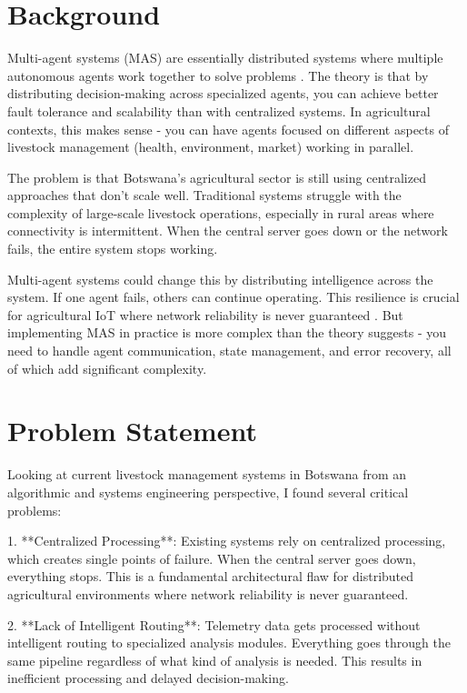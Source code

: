 
\section{Background}

Multi-agent systems (MAS) are essentially distributed systems where multiple autonomous agents work together to solve problems \cite{wooldridge2009introduction}. The theory is that by distributing decision-making across specialized agents, you can achieve better fault tolerance and scalability than with centralized systems. In agricultural contexts, this makes sense - you can have agents focused on different aspects of livestock management (health, environment, market) working in parallel.

The problem is that Botswana's agricultural sector is still using centralized approaches that don't scale well. Traditional systems struggle with the complexity of large-scale livestock operations, especially in rural areas where connectivity is intermittent. When the central server goes down or the network fails, the entire system stops working.

Multi-agent systems could change this by distributing intelligence across the system. If one agent fails, others can continue operating. This resilience is crucial for agricultural IoT where network reliability is never guaranteed \cite{jennings1998agent}. But implementing MAS in practice is more complex than the theory suggests - you need to handle agent communication, state management, and error recovery, all of which add significant complexity.

\section{Problem Statement}

Looking at current livestock management systems in Botswana from an algorithmic and systems engineering perspective, I found several critical problems:

1. **Centralized Processing**: Existing systems rely on centralized processing, which creates single points of failure. When the central server goes down, everything stops. This is a fundamental architectural flaw for distributed agricultural environments where network reliability is never guaranteed.

2. **Lack of Intelligent Routing**: Telemetry data gets processed without intelligent routing to specialized analysis modules. Everything goes through the same pipeline regardless of what kind of analysis is needed. This results in inefficient processing and delayed decision-making.

